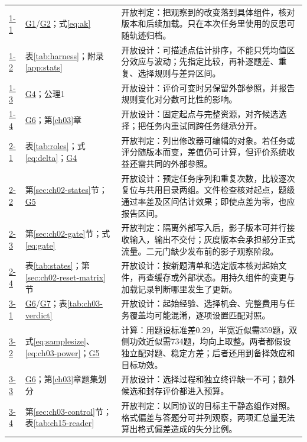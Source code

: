 \begin{small}
\begin{longtable}{@{}p{1.1cm}p{4.1cm}p{10.1cm}@{}}
\hyperref[ex:ch01-1]{1-1} & \hyperref[sol:g01]{G1}/\hyperref[sol:g02]{G2}；式\eqref{eq:ak} & 开放判定：把观察到的改变落到具体组件，核对版本和后续加载。只在本次任务里使用的反思可随轨迹归档。 \\
\hyperref[ex:ch01-2]{1-2} & 表\ref{tab:harness}；附录\ref{app:stats} & 开放设计：可描述点估计排序，不能只凭均值区分效应与波动；先指定比较，再补逐题差、重复、选择规则与差异区间。 \\
\hyperref[ex:ch01-3]{1-3} & \hyperref[sol:g04]{G4}；公理1 & 开放设计：评价可变时另保留外部参照，并报告规则变化对分数可比性的影响。 \\
\hyperref[ex:ch01-4]{1-4} & \hyperref[sol:g06]{G6}；第\ref{ch03}章 & 开放设计：固定起点与完整资源，对齐候选选择；把任务内重试同跨任务继承分开。 \\
\hyperref[ex:ch02-1]{2-1} & 表\ref{tab:roles}；式\eqref{eq:delta}；\hyperref[sol:g04]{G4} & 开放判定：列出修改器可编辑的对象。若任务或评分随版本而变，差值仍可计算，但评价系统收益还需共同的外部参照。 \\
\hyperref[ex:ch02-2]{2-2} & 第\ref{sec:ch02-states}节；\hyperref[sol:g05]{G5} & 开放设计：预定任务序列和重复次数，比较逐次复位与共用目录两组。文件检查核对起点，题级通过率差及区间估计效果；即使点差为零，也应报告区间。 \\
\hyperref[ex:ch02-3]{2-3} & 第\ref{sec:ch02-gate}节；式\eqref{eq:gate} & 开放判定：隔离外部写入后，影子版本可并行接收输入，输出不交付；灰度版本会承担部分正式流量。二元门缺少发布前的影子观察阶段。 \\
\hyperref[ex:ch02-4]{2-4} & 表\ref{tab:states}；第\ref{sec:ch02-reset-matrix}节 & 开放设计：按新题清单和选定版本核对起始文件，再查缓存或外部状态。用持久组件的变更与加载记录判断哪里发生了更新。 \\
\hyperref[ex:ch03-1]{3-1} & \hyperref[sol:g06]{G6}/\hyperref[sol:g07]{G7}；表\ref{tab:ch03-verdict} & 开放设计：起始经验、选择机会、完整费用与任务覆盖均可能混淆，逐项设置匹配对照。 \\
\hyperref[ex:ch03-2]{3-2} & 式\eqref{eq:samplesize}、\eqref{eq:ch03-power}；\hyperref[sol:g05]{G5} & 计算：用题设标准差0.29，半宽近似需359题，双侧功效近似需734题，均向上取整。两者都假设独立配对题、稳定方差；后者还用到备择效应和目标功效。 \\
\hyperref[ex:ch03-3]{3-3} & \hyperref[sol:g06]{G6}；第\ref{ch03}章题集划分 & 开放设计：选择过程和独立终评缺一不可；额外候选和封存评价都进入预算。 \\
\hyperref[ex:ch03-4]{3-4} & 第\ref{sec:ch03-control}节；表\ref{tab:ch15-reader} & 开放判定：以同协议的目标主干静态组作对照。格式偏差与答题分可并列观察，两项汇总量无法算出格式偏差造成的失分比例。 \\

\end{longtable}
\end{small}
